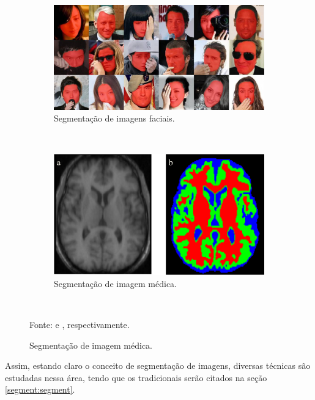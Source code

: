 \begin{figure}[H]
   \caption{Exemplos de segmentações de imagens.}
   \centering
   \label{segment:fig:1}
    \begin{subfigure}[t]{0.5\textwidth}
        \centering
        \includegraphics[width=1\linewidth]{recursos/imagens/image_seg/faces.png}
        \caption{Segmentação de imagens faciais.}
        \label{segment:fig:1.1}
    \end{subfigure}%
    ~ 

    \begin{subfigure}[t]{0.5\textwidth}
        \centering
        \includegraphics[width=1\linewidth]{recursos/imagens/image_seg/cerebro.png}
        \caption{Segmentação de imagem médica.}
        \label{segment:fig:1.2}
    \end{subfigure}%
    ~

    \vspace*{1 cm}
    Fonte: \cite{Nirkin2018OnPerception} e \cite{Withey2008ASoftware}, respectivamente.
\end{figure}

Assim, estando claro o conceito de segmentação de imagens, diversas técnicas são estudadas nessa área, tendo que os tradicionais serão citados na seção \ref{segment:segment}.


